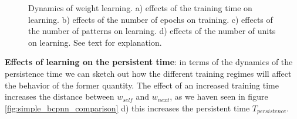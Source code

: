 \documentclass[10pt,a4paper]{article}
\begin{document}
\begin{figure}[H]%
    \centering
    \qquad
    \hfill
     \qquad
    \caption{Dynamics of weight learning. a) effects of the training time on learning. b) effects of the number of epochs on training. c) effects of the number of patterns on learning. d) effects of the number of units on learning. See text for explanation.}
    \label{fig:simple_bcpnn_learning}%
\end{figure}



\textbf{Effects of learning on the persistent time}: in terms of the dynamics of the persistence time we can sketch out how the different training regimes will affect the behavior of the former quantity. The effect of an increased training time increases the distance between $w_{self}$ and $w_{next}$, as we haven seen in figure \ref{fig:simple_bcpnn_comparison} d) this increases the persistent time $T_{persistence}$. 
\end{document}

